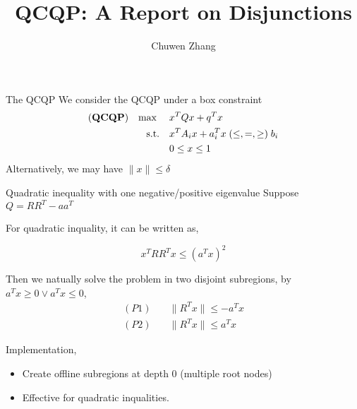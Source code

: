 \documentclass[aspectratio=1610, 10pt]{beamer}
\newcommand{\model}[1]{(\textbf{#1})}
\newcommand{\mx}{\mathbf{\max}\;}
\begin{document}
\title{QCQP: A Report on Disjunctions}

\author{
  Chuwen Zhang
}


\maketitle
\begin{frame}{The QCQP}
  We consider the QCQP under a box constraint
  \begin{equation}
    \label{eq:inhoqcqp}
    \begin{aligned}
      \model{QCQP} \quad \mx \quad & x^T Qx + q^T x                                    \\
      \textrm{s.t.} \quad          & x^T A_i x + a_i^T x \hspace{0.27em} (\le, =, \ge)
      \hspace{0.27em} b_i                                                              \\
                                   & 0 \le x \le 1
    \end{aligned}
  \end{equation}
  Alternatively, we may have \(\|x\| \le \delta\)
\end{frame}
\begin{frame}[allowframebreaks]{Quadratic inequality with one negative/positive eigenvalue}
  Suppose \(Q = RR^T - aa^T\)

  For quadratic inquality,  it can be written as,

  \begin{equation*}
    x^TRR^Tx \le (a^Tx)^2
  \end{equation*}

  Then we natually solve the problem in two disjoint subregions, by \(a^Tx \ge 0 \vee  a^Tx \le 0 \),
  \begin{align*}
    (P1) \quad & \|R^Tx\| \le - a^Tx \\
    (P2) \quad & \|R^Tx\| \le a^Tx
  \end{align*}

  Implementation,
  \begin{itemize}
    \item Create offline subregions at depth 0 (multiple root nodes)
    \item Effective for quadratic inqualities.
  \end{itemize}

\end{frame}
\end{document}
